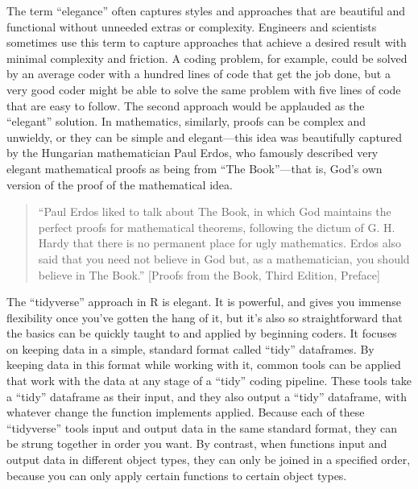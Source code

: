 \documentclass[]{tufte-book}
\begin{document}
The term ``elegance'' often captures styles and approaches that are beautiful and
functional without unneeded extras or complexity. Engineers and scientists
sometimes use this term to capture approaches that achieve a desired result with
minimal complexity and friction. A coding problem, for example, could be solved
by an average coder with a hundred lines of code that get the job done, but a
very good coder might be able to solve the same problem with five lines of code
that are easy to follow. The second approach would be applauded as the ``elegant''
solution. In mathematics, similarly, proofs can be complex and unwieldy, or they
can be simple and elegant---this idea was beautifully captured by the Hungarian
mathematician Paul Erdos, who famously described very elegant mathematical proofs
as being from ``The Book''---that is, God's own version of the proof of the
mathematical idea.

\begin{quote}
``Paul Erdos liked to talk about The Book, in which God maintains the perfect
proofs for mathematical theorems, following the dictum of G. H. Hardy that
there is no permanent place for ugly mathematics. Erdos also said that you
need not believe in God but, as a mathematician, you should believe in
The Book.'' {[}Proofs from the Book, Third Edition, Preface{]}
\end{quote}

The ``tidyverse'' approach in R is elegant. It is powerful, and gives you immense
flexibility once you've gotten the hang of it, but it's also so straightforward
that the basics can be quickly taught to and applied by beginning coders. It
focuses on keeping data in a simple, standard format called ``tidy'' dataframes.
By keeping data in this format while working with it, common tools can be applied
that work with the data at any stage of a ``tidy'' coding pipeline. These tools take
a ``tidy'' dataframe as their input, and they also output a ``tidy'' dataframe, with
whatever change the function implements applied. Because each of these ``tidyverse''
tools input and output data in the same standard format, they can be strung together
in order you want. By contrast, when functions input and output data in different
object types, they can only be joined in a specified order, because you can only
apply certain functions to certain object types.
\end{document}
